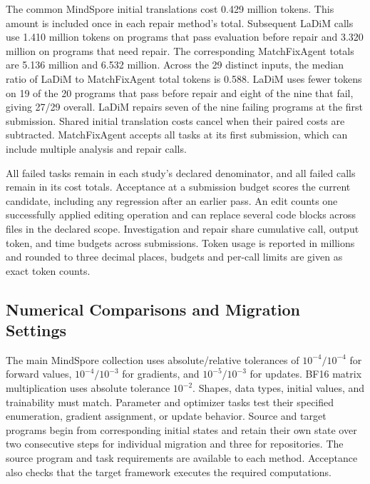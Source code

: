 The common MindSpore initial translations cost 0.429 million tokens. This amount is included once in each repair method's total. Subsequent LaDiM calls use 1.410 million tokens on programs that pass evaluation before repair and 3.320 million on programs that need repair. The corresponding MatchFixAgent totals are 5.136 million and 6.532 million. Across the 29 distinct inputs, the median ratio of LaDiM to MatchFixAgent total tokens is 0.588. LaDiM uses fewer tokens on 19 of the 20 programs that pass before repair and eight of the nine that fail, giving 27/29 overall. LaDiM repairs seven of the nine failing programs at the first submission. Shared initial translation costs cancel when their paired costs are subtracted. MatchFixAgent accepts all tasks at its first submission, which can include multiple analysis and repair calls.

All failed tasks remain in each study's declared denominator, and all failed calls remain in its cost totals. Acceptance at a submission budget scores the current candidate, including any regression after an earlier pass. An edit counts one successfully applied editing operation and can replace several code blocks across files in the declared scope. Investigation and repair share cumulative call, output token, and time budgets across submissions. Token usage is reported in millions and rounded to three decimal places, budgets and per-call limits are given as exact token counts.
\begin{table}[!htb]
\caption{Complete input and output token costs by method for the two program migration collections. Input, output, and total tokens are in millions. Calls and tokens include initial translation and every subsequent call. Acceptance uses the declared task denominator for each collection.}
\label{tab:program-costs}
\centering
\small
\setlength{\tabcolsep}{3pt}

\end{table}

\subsection{Numerical Comparisons and Migration Settings}
\label{sec:migration-settings}
The main MindSpore collection uses absolute/relative tolerances of $10^{-4}/10^{-4}$ for forward values, $10^{-4}/10^{-3}$ for gradients, and $10^{-5}/10^{-3}$ for updates. BF16 matrix multiplication uses absolute tolerance $10^{-2}$. Shapes, data types, initial values, and trainability must match. Parameter and optimizer tasks test their specified enumeration, gradient assignment, or update behavior. Source and target programs begin from corresponding initial states and retain their own state over two consecutive steps for individual migration and three for repositories. The source program and task requirements are available to each method. Acceptance also checks that the target framework executes the required computations.

